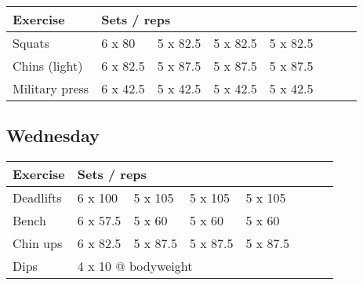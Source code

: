 \documentclass[12pt, a4paper]{article}%
\begin{document}
  \begin{tabular}{l|lllllll}
  \hspace{0.75em} \textbf{Exercise} & \multicolumn{ 7 }{l}{ \textbf{Sets / reps} } \\ \hline

            \hspace{0.75em} Squats
            & 6 x 80
            & 5 x 82.5
            & 5 x 82.5
            & 5 x 82.5
            & 
            & 
            & 
            \\


            \hspace{0.75em} Chins (light)
            & 6 x 82.5
            & 5 x 87.5
            & 5 x 87.5
            & 5 x 87.5
            & 
            & 
            & 
            \\


            \hspace{0.75em} Military press
            & 6 x 42.5
            & 5 x 42.5
            & 5 x 42.5
            & 5 x 42.5
            & 
            & 
            & 
            \\


  \end{tabular}

  \subsection*{\hspace{0.5em} Wednesday }


  \begin{tabular}{l|lllllll}
  \hspace{0.75em} \textbf{Exercise} & \multicolumn{ 7 }{l}{ \textbf{Sets / reps} } \\ \hline

            \hspace{0.75em} Deadlifts
            & 6 x 100
            & 5 x 105
            & 5 x 105
            & 5 x 105
            & 
            & 
            & 
            \\


            \hspace{0.75em} Bench
            & 6 x 57.5
            & 5 x 60
            & 5 x 60
            & 5 x 60
            & 
            & 
            & 
            \\


            \hspace{0.75em} Chin ups
            & 6 x 82.5
            & 5 x 87.5
            & 5 x 87.5
            & 5 x 87.5
            & 
            & 
            & 
            \\


   \hspace{0.75em} Dips &  \multicolumn{ 7 }{l}{ 4 x 10 @ bodyweight } \\
  \end{tabular}
\end{document}
